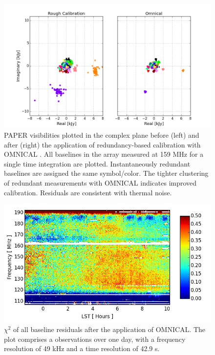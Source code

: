 \documentclass[twocolumn,numberedappendix]{emulateapj} \shorttitle{PSA64}
\begin{document}
\begin{figure}
\centering
\includegraphics[width=1.5\columnwidth]{plots/omniview_64.png}
\caption{
PAPER visibilities plotted in the complex plane before (left) and after (right)
the application of redundancy-based calibration with OMNICAL \citep{zheng_et_al2014}.
All baselines in the array measured at 159 MHz for a single time integration are plotted.
Instantaneously redundant baselines are assigned the same symbol/color.
The tighter clustering of redundant measurements with OMNICAL indicates improved
calibration.  Residuals are consistent with thermal noise.
} \label{fig:omniview}
\end{figure}

\begin{figure}[!b]
\centering
\includegraphics[width=\columnwidth]{plots/chi2.png}
\caption{
$\chi^{2}$ of all baseline residuals after the application of OMNICAL.
The plot comprises a observations over one day, with a frequency resolution of
49 kHz and a time resolution of 42.9 s.
} \label{fig:chi2}
\end{figure}
\end{document}
